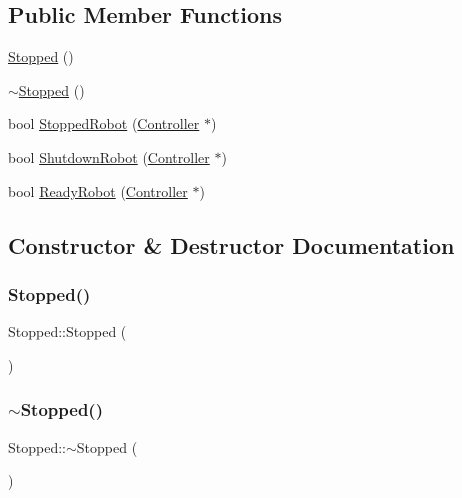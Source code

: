 \subsection*{Public Member Functions}
\begin{DoxyCompactItemize}
\item 
\mbox{\hyperlink{class_stopped_a4bbacbad128a8942b996fafaede22416}{Stopped}} ()
\item 
\mbox{\hyperlink{class_stopped_add9a4e0036f6d3885b6f45cc5f868cec}{$\sim$\+Stopped}} ()
\item 
bool \mbox{\hyperlink{class_stopped_adbd9841ac4c2f267e07d683e389593a4}{Stopped\+Robot}} (\mbox{\hyperlink{class_controller}{Controller}} $\ast$)
\item 
bool \mbox{\hyperlink{class_stopped_ab3e25b89de8b1fead0e6faa766b40da0}{Shutdown\+Robot}} (\mbox{\hyperlink{class_controller}{Controller}} $\ast$)
\item 
bool \mbox{\hyperlink{class_stopped_ac47fcf352b8724dd41de6a5db7976b88}{Ready\+Robot}} (\mbox{\hyperlink{class_controller}{Controller}} $\ast$)
\end{DoxyCompactItemize}


\subsection{Constructor \& Destructor Documentation}
\mbox{\label{class_stopped_a4bbacbad128a8942b996fafaede22416}} 
\subsubsection{\texorpdfstring{Stopped()}{Stopped()}}
{\footnotesize\ttfamily Stopped\+::\+Stopped (\begin{DoxyParamCaption}{ }\end{DoxyParamCaption})}

\mbox{\label{class_stopped_add9a4e0036f6d3885b6f45cc5f868cec}} 
\subsubsection{\texorpdfstring{$\sim$Stopped()}{~Stopped()}}
{\footnotesize\ttfamily Stopped\+::$\sim$\+Stopped (\begin{DoxyParamCaption}{ }\end{DoxyParamCaption})}



